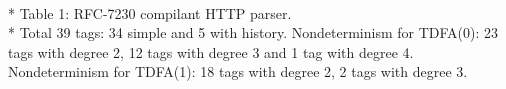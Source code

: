 \documentclass{article}
\theoremstyle{definition}
\begin{document}
\begin{center}
\begin{tabular}{|c|ccccccccccc|}
    \hline
    \end{tabular}\\*
    \medskip
    Table 1: RFC-7230 compilant HTTP parser.\\*
    \medskip
    \footnotesize{Total 39 tags: 34 simple and 5 with history.
    Nondeterminism for TDFA(0): 23 tags with degree 2, 12 tags with degree 3 and 1 tag with degree 4.
    Nondeterminism for TDFA(1): 18 tags with degree 2, 2 tags with degree 3.}
    \bigskip
\end{center}
\end{document}
